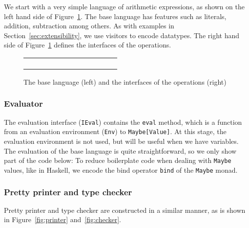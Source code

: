 We start with a very simple language of arithmetic expressions, as shown on the
left hand side of Figure~\ref{fig:base-lang}. The base language has features
such as literals, addition, subtraction among others. As with examples in
Section~\ref{sec:extensibility}, we use visitors to encode datatypes. The
right hand side of Figure~\ref{fig:base-lang} defines the interfaces of the
operations.

\begin{figure}[t]
  \centering
  \begin{tabular}{cc}
    \begin{subfigure}[t]{0.45\textwidth}
      \centering
    \end{subfigure}
    &
    \begin{subfigure}[t]{0.45\textwidth}
      \centering
    \end{subfigure}
  \end{tabular}
  \caption{The base language (left) and the interfaces of the operations (right)}
  \label{fig:base-lang}
\end{figure}

\subsubsection{Evaluator}

The evaluation interface (\lstinline{IEval}) contains the \lstinline{eval}
method, which is a function from an evaluation environment (\lstinline{Env}) to
\lstinline{Maybe[Value]}. At this stage, the evaluation environment is not used,
but will be useful when we have variables. The evaluation of the base language
is quite straightforward, so we only show part of the code below:
To reduce boilerplate code when dealing with \lstinline{Maybe} values, like in
Haskell, we encode the bind operator \lstinline{bind} of the \lstinline{Maybe}
monad.

\subsubsection{Pretty printer and type checker}

Pretty printer and type checker are constructed in a similar manner, as is shown
in Figure~\ref{fig:printer} and~\ref{fig:checker}.

